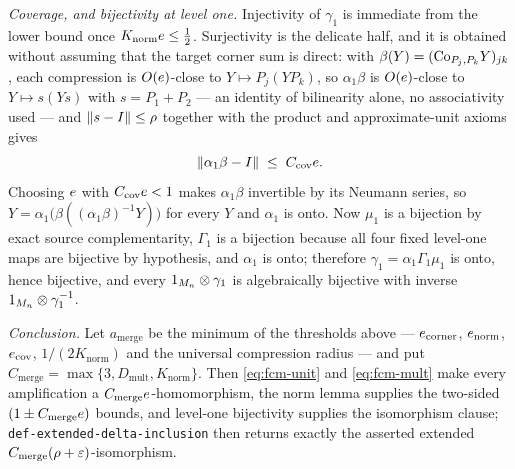 \emph{Coverage, and bijectivity at level one.} Injectivity of $\gamma_1$ is immediate from
the lower bound once $K_{\mathrm{norm}}e\le\tfrac12$. Surjectivity is the delicate
half, and it is obtained without assuming that the target corner sum is direct: with
$\beta(Y)=(\mathrm{Co}_{P_j,P_k}Y)_{jk}$, each compression is $O(e)$-close to
$Y\mapsto P_j(YP_k)$, so $\alpha_1\beta$ is $O(e)$-close to $Y\mapsto s(Ys)$ with
$s=P_1+P_2$ --- an identity of bilinearity alone, no associativity used --- and
$\lVert s-I\rVert\le\rho$ together with the product and approximate-unit axioms gives
\begin{equation}\label{eq:fcm-cov}
  \lVert \alpha_1\beta-I\rVert\;\le\;C_{\mathrm{cov}}e .
\end{equation}
Choosing $e$ with $C_{\mathrm{cov}}e<1$ makes $\alpha_1\beta$ invertible by its
Neumann series, so $Y=\alpha_1\bigl(\beta((\alpha_1\beta)^{-1}Y)\bigr)$ for every $Y$ and
$\alpha_1$ is onto. Now $\mu_1$ is a bijection by exact source complementarity, $\Gamma_1$
is a bijection because all four fixed level-one maps are bijective by hypothesis, and
$\alpha_1$ is onto; therefore $\gamma_1=\alpha_1\Gamma_1\mu_1$ is onto, hence bijective,
and every $1_{M_{n}}\otimes\gamma_1$ is algebraically bijective with inverse
$1_{M_{n}}\otimes\gamma_1^{-1}$.

\emph{Conclusion.} Let $a_{\mathrm{merge}}$ be the minimum of the thresholds above ---
$e_{\mathrm{corner}}$, $e_{\mathrm{norm}}$, $e_{\mathrm{cov}}$,
$1/(2K_{\mathrm{norm}})$ and the universal compression radius --- and put
$C_{\mathrm{merge}}=\max\{3,D_{\mathrm{mult}},K_{\mathrm{norm}}\}$. Then
\eqref{eq:fcm-unit} and \eqref{eq:fcm-mult} make every amplification a
$C_{\mathrm{merge}}e$-homomorphism, the norm lemma supplies the two-sided
$(1\pm C_{\mathrm{merge}}e)$ bounds, and level-one bijectivity supplies the
isomorphism clause; \texttt{def-extended-delta-inclusion} then returns exactly the
asserted extended $C_{\mathrm{merge}}(\rho+\varepsilon)$-isomorphism.

